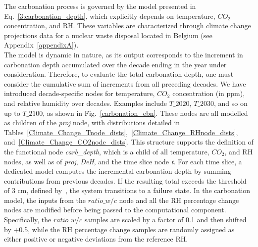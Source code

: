 The carbonation process is governed by the model presented in Eq.~\ref{3:carbonation_depth}, which explicitly depends on temperature, $CO_2$ concentration, and RH. 
These variables are characterized through climate change projections data for a nuclear waste disposal located in Belgium (see Appendix~\ref{appendixA}). \\
The model is dynamic in nature, as its output corresponds to the increment in carbonation depth accumulated over the decade ending in the year under consideration. Therefore, to evaluate the total carbonation depth, one must consider the cumulative sum of increments from all preceding decades.
We have introduced decade-specific nodes for temperature, $CO_2$ concentration (in ppm), and relative humidity over decades.
Examples include $T\_ {2020}$, $T\_ {2030}$, and so on up to $T\_ {2100}$, as shown in Fig.~\ref{carbonation_ebn}. These nodes are all modelled as children of the \textit{proj} node, with distributions detailed in Tables~\ref{Climate_Change_Tnode_dists},~\ref{Climate_Change_RHnode_dists}, and~\ref{Climate_Change_CO2node_dists}.
This structure supports the definition of the functional node \textit{carb\_depth}, which is a child of all temperature, $CO_2$, and RH nodes, as well as of \textit{proj}, \textit{DeH}, and the time slice node \textit{t}. 
For each time slice, a dedicated model computes the incremental carbonation depth by summing contributions from previous decades. 
If the resulting total exceeds the threshold of 3 cm, defined by~\textcite{Carbonation_BASTIDASARTEAGA}, the system transitions to a failure state. 
In the carbonation model, the inputs from the $ratio\_w/c$ node and all the RH percentage change nodes are modified before being passed to the computational component. 
Specifically, the $ratio\_w/c$ samples are scaled by a factor of 0.1 and then shifted by +0.5, while the RH percentage change samples are randomly assigned as either positive or negative deviations from the reference RH.

